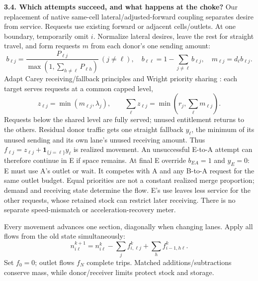 \documentclass[11pt,a4paper]{article}
\begin{document}
\textbf{3.4. Which attempts succeed, and what happens at the choke?}
Our replacement of native same-cell lateral/adjusted-forward coupling
separates desire from service. Requests use existing forward or adjacent
cells/outlets. At one boundary, temporarily omit $i$.
Normalize lateral desires, leave the rest for straight
travel, and form requests $m$ from each donor's one sending amount:
\begin{equation}
 b_{\ell j}=\frac{P_{\ell j}}{\max(1,\sum_{h\ne\ell}P_{\ell h})}\ (j\ne\ell),
 \quad b_{\ell\ell}=1-\sum_{j\ne\ell}b_{\ell j},\quad
 m_{\ell j}=d_\ell b_{\ell j}.\label{eq:requests}
\end{equation}
Adapt Carey receiving/fallback principles and Wright priority sharing
\cite{carey,wright}: each target serves requests at a common capped level,
\begin{equation}
 z_{\ell j}=\min(m_{\ell j},\lambda_j),\qquad
 \sum_\ell z_{\ell j}=\min\!\left(r_j,\sum_\ell m_{\ell j}\right).\label{eq:sharing}
\end{equation}
Requests below the shared level are fully served; unused entitlement returns to the others.
Residual donor traffic gets one straight fallback $y_\ell$, the minimum of
its unused sending and its own lane's unused receiving amount. Thus
$f_{\ell j}=z_{\ell j}+\mathbf1_{\{j=\ell\}}y_\ell$ is realized movement.
An unsuccessful E-to-A attempt can therefore continue in E if space remains.
At final E override $b_{EA}=1$ and $y_E=0$: E must use A's outlet or wait.
It competes with A and any B-to-A request for the same outlet budget.
Equal priorities are not a constant realized merge proportion; demand and
receiving state determine the flow. E's use leaves less service for the
other requests, whose retained stock can restrict later receiving.
There is no separate speed-mismatch or acceleration-recovery meter.

Every movement advances one section, diagonally when changing lanes.
Apply all flows from the old state simultaneously:
\begin{equation}
 n^{k+1}_{i\ell}=n^k_{i\ell}-\sum_j f^k_{i,\ell j}
                             +\sum_h f^k_{i-1,h\ell}.\label{eq:update}
\end{equation}
Set $f_0=0$; outlet flows $f_N$ complete trips. Matched additions/subtractions
conserve mass, while donor/receiver limits protect stock and storage.
\end{document}
